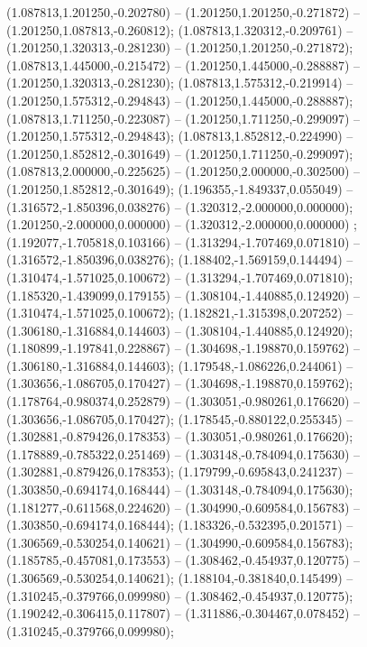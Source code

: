 (1.087813,1.201250,-0.202780) -- (1.201250,1.201250,-0.271872) -- (1.201250,1.087813,-0.260812);
 (1.087813,1.320312,-0.209761) -- (1.201250,1.320313,-0.281230) -- (1.201250,1.201250,-0.271872);
 (1.087813,1.445000,-0.215472) -- (1.201250,1.445000,-0.288887) -- (1.201250,1.320313,-0.281230);
 (1.087813,1.575312,-0.219914) -- (1.201250,1.575312,-0.294843) -- (1.201250,1.445000,-0.288887);
 (1.087813,1.711250,-0.223087) -- (1.201250,1.711250,-0.299097) -- (1.201250,1.575312,-0.294843);
 (1.087813,1.852812,-0.224990) -- (1.201250,1.852812,-0.301649) -- (1.201250,1.711250,-0.299097);
 (1.087813,2.000000,-0.225625) -- (1.201250,2.000000,-0.302500) -- (1.201250,1.852812,-0.301649);
 (1.196355,-1.849337,0.055049) -- (1.316572,-1.850396,0.038276) -- (1.320312,-2.000000,0.000000);
 (1.201250,-2.000000,0.000000) -- (1.320312,-2.000000,0.000000) ;
 (1.192077,-1.705818,0.103166) -- (1.313294,-1.707469,0.071810) -- (1.316572,-1.850396,0.038276);
 (1.188402,-1.569159,0.144494) -- (1.310474,-1.571025,0.100672) -- (1.313294,-1.707469,0.071810);
 (1.185320,-1.439099,0.179155) -- (1.308104,-1.440885,0.124920) -- (1.310474,-1.571025,0.100672);
 (1.182821,-1.315398,0.207252) -- (1.306180,-1.316884,0.144603) -- (1.308104,-1.440885,0.124920);
 (1.180899,-1.197841,0.228867) -- (1.304698,-1.198870,0.159762) -- (1.306180,-1.316884,0.144603);
 (1.179548,-1.086226,0.244061) -- (1.303656,-1.086705,0.170427) -- (1.304698,-1.198870,0.159762);
 (1.178764,-0.980374,0.252879) -- (1.303051,-0.980261,0.176620) -- (1.303656,-1.086705,0.170427);
 (1.178545,-0.880122,0.255345) -- (1.302881,-0.879426,0.178353) -- (1.303051,-0.980261,0.176620);
 (1.178889,-0.785322,0.251469) -- (1.303148,-0.784094,0.175630) -- (1.302881,-0.879426,0.178353);
 (1.179799,-0.695843,0.241237) -- (1.303850,-0.694174,0.168444) -- (1.303148,-0.784094,0.175630);
 (1.181277,-0.611568,0.224620) -- (1.304990,-0.609584,0.156783) -- (1.303850,-0.694174,0.168444);
 (1.183326,-0.532395,0.201571) -- (1.306569,-0.530254,0.140621) -- (1.304990,-0.609584,0.156783);
 (1.185785,-0.457081,0.173553) -- (1.308462,-0.454937,0.120775) -- (1.306569,-0.530254,0.140621);
 (1.188104,-0.381840,0.145499) -- (1.310245,-0.379766,0.099980) -- (1.308462,-0.454937,0.120775);
 (1.190242,-0.306415,0.117807) -- (1.311886,-0.304467,0.078452) -- (1.310245,-0.379766,0.099980);
